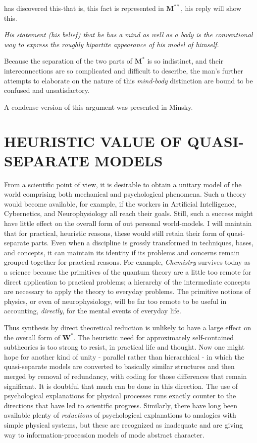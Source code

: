 \documentclass{article}
\begin{document}
has discovered this-that is, this fact is represented in $\mathbf{M^{\ast\ast}}$, his reply will show this.

\begin{displayquote}
\textit{His statement (his belief) that he has a mind as well as a body is the conventional way to express the roughly bipartite appearance of his model of himself.}
\end{displayquote}

Because the separation of the two parts of $\mathbf{M^{\ast}}$ is so indistinct, and their interconnections are so complicated and difficult to describe, the man's further attempts to elaborate on the nature of this \textit{mind-body} distinction are bound to be confused and unsatisfactory.

A condense version of this argument was presented in Minsky\cite{minsky}.

\section*{HEURISTIC VALUE OF QUASI-SEPARATE MODELS}

From a scientific point of view, it is desirable to obtain a unitary model of the world comprising both mechanical and psychological phenomena. Such a theory would become available, for example, if the workers in Artificial Intelligence, Cybernetics, and Neurophysiology all reach their goals. Still, such a success might have little effect on the overall form of out personal world-models. I will maintain that for practical, heuristic reasons, these would still retain their form of quasi-separate parts. Even when a discipline is grossly transformed in techniques, bases, and concepts, it can maintain its identity if its problems and concerns remain grouped together for practical reasons. For example, \textit{Chemistry} survives today as a science because the primitives of the quantum theory are a little too remote for direct application to practical problems; a hierarchy of the intermediate concepts are necessary to apply the theory to everyday problems. The primitive notions of physics, or even of neurophysiology, will be far too remote to be useful in accounting, \textit{directly}, for the mental events of everyday life.

Thus synthesis by direct theoretical reduction is unlikely to have a large effect on the overall form of $\mathbf{W^{\ast}}$. The heuristic need for approximately self-contained subtheories is too strong to resist, in practical life and thought. Now one might hope for another kind of unity - parallel rather than hierarchical - in which the quasi-separate models are converted to basically similar structures and then merged by removal of redundancy, with coding for those differences that remain significant. It is doubtful that much can be done in this direction. The use of psychological explanations for physical processes runs exactly counter to the directions that have led to scientific progress. Similarly, there have long been available plenty of \textit{reductions} of psychological explanations to analogies with simple physical systems, but these are recognized as inadequate and are giving way to information-procession models of mode abstract character.
\end{document}
